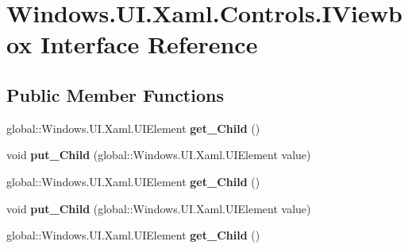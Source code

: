 \hypertarget{interface_windows_1_1_u_i_1_1_xaml_1_1_controls_1_1_i_viewbox}{}\section{Windows.\+U\+I.\+Xaml.\+Controls.\+I\+Viewbox Interface Reference}
\label{interface_windows_1_1_u_i_1_1_xaml_1_1_controls_1_1_i_viewbox}
\subsection*{Public Member Functions}
\begin{DoxyCompactItemize}
\item 
\mbox{\label{interface_windows_1_1_u_i_1_1_xaml_1_1_controls_1_1_i_viewbox_a9f29b16104bada3b3fc1bb5e10080887}} 
global\+::\+Windows.\+U\+I.\+Xaml.\+U\+I\+Element {\bfseries get\+\_\+\+Child} ()
\item 
\mbox{\label{interface_windows_1_1_u_i_1_1_xaml_1_1_controls_1_1_i_viewbox_a21415353a79c331b067409a6923bb18d}} 
void {\bfseries put\+\_\+\+Child} (global\+::\+Windows.\+U\+I.\+Xaml.\+U\+I\+Element value)
\item 
\mbox{\label{interface_windows_1_1_u_i_1_1_xaml_1_1_controls_1_1_i_viewbox_a9f29b16104bada3b3fc1bb5e10080887}} 
global\+::\+Windows.\+U\+I.\+Xaml.\+U\+I\+Element {\bfseries get\+\_\+\+Child} ()
\item 
\mbox{\label{interface_windows_1_1_u_i_1_1_xaml_1_1_controls_1_1_i_viewbox_a21415353a79c331b067409a6923bb18d}} 
void {\bfseries put\+\_\+\+Child} (global\+::\+Windows.\+U\+I.\+Xaml.\+U\+I\+Element value)
\item 
\mbox{\label{interface_windows_1_1_u_i_1_1_xaml_1_1_controls_1_1_i_viewbox_a9f29b16104bada3b3fc1bb5e10080887}} 
global\+::\+Windows.\+U\+I.\+Xaml.\+U\+I\+Element {\bfseries get\+\_\+\+Child} ()
\item 
\mbox{\label{interface_windows_1_1_u_i_1_1_xaml_1_1_controls_1_1_i_viewbox_a21415353a79c331b067409a6923bb18d}} 

\end{DoxyCompactItemize}
